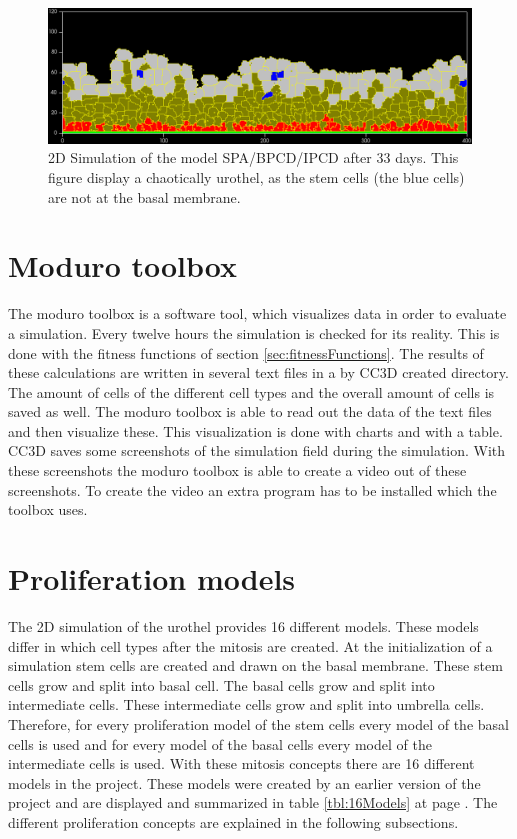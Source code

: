 \begin{figure}[ht]
	\center
	\includegraphics[scale=0.35]{figures/2DSimulation-33Days.png}
	\caption[2D Simulation of the model SPA/BPCD/IPCD after 33 days]{2D Simulation of the model SPA/BPCD/IPCD after 33 days. This figure display a chaotically urothel, as the stem cells (the blue cells) are not at the basal membrane.}
	\label{img:2DSimulation33Days}
\end{figure}

\section{Moduro toolbox}
The moduro toolbox is a software tool, which visualizes data in order to evaluate a simulation. \newline
Every twelve hours the simulation is checked for its reality. This is done with the fitness functions of section \ref{sec:fitnessFunctions}. The results of these calculations are written in several text files in a by \ac{CC3D} created directory. The amount of cells of the different cell types and the overall amount of cells is saved as well. The moduro toolbox is able to read out the data of the text files and then visualize these. This visualization is done with charts and with a table. \newline
\ac{CC3D} saves some screenshots of the simulation field during the simulation. With these screenshots the moduro toolbox is able to create a video out of these screenshots. To create the video an extra program has to be installed which the toolbox  uses.

\section{Proliferation models}\label{sec:Models}
The 2D simulation of the urothel provides 16 different models. These models differ in which cell types after the mitosis are created. \newline 
At the initialization of a simulation stem cells are created and drawn on the basal membrane. These stem cells grow and split into basal cell. The basal cells grow and split into intermediate cells. These intermediate cells grow and split into umbrella cells. Therefore, for every proliferation model of the stem cells every model of the basal cells is used and for every model of the basal cells every model of the intermediate cells is used. \newline
With these mitosis concepts there are 16 different models in the project. These models were created by an earlier version of the project \cite{Torelli2017} and are displayed and summarized in table \ref{tbl:16Models} at page \pageref{tbl:16Models}. The different proliferation concepts are explained in the following subsections.


